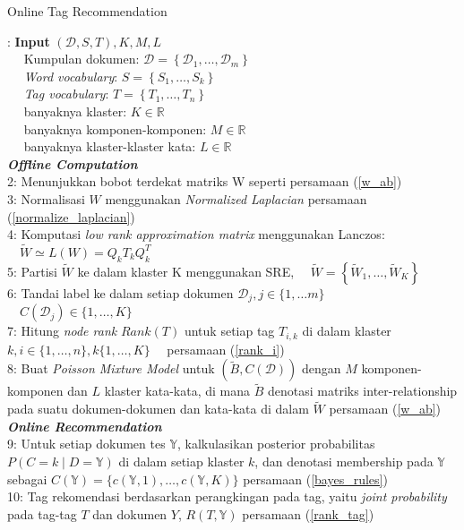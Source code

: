 \begin{algorithm} [H]
\caption{Online Tag Recommendation \citep*{song2008autotag}}\label{alg:online_tag_recommendation_2}
\label{algoritma:automatic_tag}
\begin{algorithmic}
: \textbf{Input} $(\mathcal{D}, S, T), K, M, L$ \\
$\quad$ Kumpulan dokumen: $\mathcal{D}=\left\{\mathcal{D}_{1}, \ldots, \mathcal{D}_{m}\right\}$ \\
$\quad$ \textit{Word vocabulary}: $S=\left\{S_{1}, \ldots, S_{k}\right\}$ \\
$\quad$ \textit{Tag vocabulary}: $T=\left\{T_{1}, \ldots, T_{n}\right\}$ \\
$\quad$ banyaknya klaster: $K \in \mathbb{R}$ \\
$\quad$ banyaknya komponen-komponen: $M \in \mathbb{R}$ \\
$\quad$ banyaknya klaster-klaster kata: $ L \in \mathbb{R} $ \\
\textit{\textbf{Offline Computation}} \\
2: Menunjukkan bobot terdekat matriks W seperti persamaan (\ref{w_ab}) \\
3: Normalisasi $W$ menggunakan \textit{Normalized Laplacian} persamaan (\ref{normalize_laplacian}) \\
4: Komputasi \textit{low rank approximation matrix} menggunakan Lanczos: \\
$\quad \tilde{W} \simeq L(W)=Q_{k} T_{k} Q_{k}^{T}$ \\
5: Partisi $\tilde{W}$ ke dalam klaster K menggunakan SRE, 
$\quad \tilde{W}=\left\{\tilde{W}_{1}, \ldots, \tilde{W}_{K}\right\}$ \\
6: Tandai label ke dalam setiap dokumen $\mathcal{D}_{j}, j \in\{1, \ldots m\}$ \\
$\quad C\left(\mathcal{D}_{j}\right) \in\{1, \ldots, K\}$ \\
7: Hitung \textit{node rank} $Rank(T)$ untuk setiap tag $T_{i, k}$ di dalam klaster \\
$k, i \in\{1, \ldots, n\}, k\{1, \ldots, K\} \quad$ persamaan (\ref{rank_i}) \\
8: Buat \textit{Poisson Mixture Model} untuk $(\tilde{B}, C(\mathcal{D}))$ dengan $M$ komponen-komponen dan $L$ klaster kata-kata, di mana $\tilde{B}$ denotasi matriks inter-relationship pada suatu dokumen-dokumen dan kata-kata di dalam $\tilde{W}$ persamaan (\ref{w_ab})\\
\textit{\textbf{Online Recommendation}} \\
9: Untuk setiap dokumen tes $\mathbb{Y}$, kalkulasikan posterior probabilitas \\
$P(C=k \mid D=\mathbb{Y})$ di dalam setiap klaster $k$, dan denotasi membership pada $\mathbb{Y}$ sebagai $C(\mathbb{Y})=\{c(\mathbb{Y}, 1), \ldots, c(\mathbb{Y}, K)\}$ persamaan (\ref{bayes_rules}) \\
10: Tag rekomendasi berdasarkan perangkingan pada tag, yaitu \textit{joint probability} pada tag-tag $T$ dan dokumen $Y$, $R(T, \mathbb{Y})$ persamaan (\ref{rank_tag}) \\
\end{algorithmic}
\end{algorithm}

